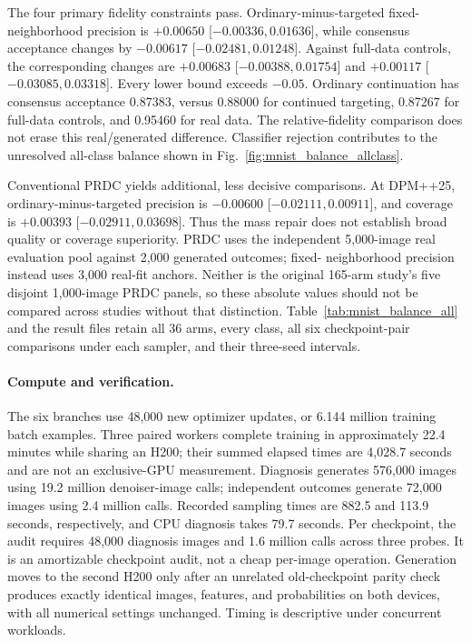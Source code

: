 The four primary fidelity constraints pass. Ordinary-minus-targeted
fixed-neighborhood precision is $+0.00650$ [$-0.00336,0.01636$], while
consensus acceptance changes by $-0.00617$ [$-0.02481,0.01248$].
Against full-data controls, the corresponding changes are $+0.00683$
[$-0.00388,0.01754$] and $+0.00117$ [$-0.03085,0.03318$]. Every lower
bound exceeds $-0.05$. Ordinary continuation has consensus acceptance
0.87383, versus 0.88000 for continued targeting, 0.87267 for full-data
controls, and 0.95460 for real data. The relative-fidelity comparison does
not erase this real/generated difference. Classifier rejection contributes
to the unresolved all-class balance shown in
Fig.~\ref{fig:mnist_balance_allclass}.

Conventional PRDC yields additional, less decisive comparisons. At DPM++25,
ordinary-minus-targeted precision is $-0.00600$ [$-0.02111,0.00911$], and
coverage is $+0.00393$ [$-0.02911,0.03698$]. Thus the mass repair does not
establish broad quality or coverage superiority. PRDC uses the independent
5,000-image real evaluation pool against 2,000 generated outcomes; fixed-
neighborhood precision instead uses 3,000 real-fit anchors. Neither is the
original 165-arm study's five disjoint 1,000-image PRDC panels, so these
absolute values should not be compared across studies without that distinction.
Table~\ref{tab:mnist_balance_all} and the result files retain all 36 arms,
every class, all six checkpoint-pair comparisons under each sampler, and
their three-seed intervals.

\paragraph{Compute and verification.}
The six branches use 48,000 new optimizer updates, or 6.144 million training
batch examples. Three paired workers complete training in approximately
22.4 minutes while sharing an H200; their summed elapsed times are 4,028.7
seconds and are not an exclusive-GPU measurement. Diagnosis generates
576,000 images using 19.2 million denoiser-image calls; independent outcomes
generate 72,000 images using 2.4 million calls. Recorded sampling times are
882.5 and 113.9 seconds, respectively, and CPU diagnosis takes 79.7 seconds.
Per checkpoint, the audit requires 48,000 diagnosis images and 1.6 million
calls across three probes. It is an amortizable checkpoint audit, not a
cheap per-image operation. Generation moves to the second H200 only after
an unrelated old-checkpoint parity check produces exactly identical images,
features, and probabilities on both devices, with all numerical settings
unchanged. Timing is descriptive under concurrent workloads.

